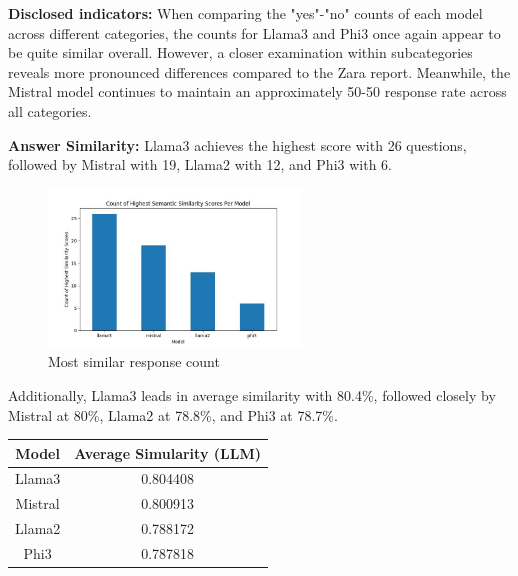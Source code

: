 \documentclass[]{article}
\begin{document}
\textbf{Disclosed indicators:} When comparing the "yes"-"no" counts of each model across different categories, 
the counts for Llama3 and Phi3 once again appear to be quite similar overall. However, 
a closer examination within subcategories reveals more pronounced differences compared to the Zara report. 
Meanwhile, the Mistral model continues to maintain an approximately 50-50 response rate across all categories.
\newline\newline

\textbf{Answer Similarity:} 
Llama3 achieves the highest score with 26 questions, followed by Mistral with 19, Llama2 with 12, and Phi3 with 6.

\begin{figure}[H]
    \centering
    \includegraphics[width=0.6\textwidth]{./images/highest_count_hm.jpg}
    \caption{Most similar response count}
    \label{fig:image_label}
\end{figure}

Additionally, Llama3 leads in average similarity with 80.4\%, followed closely by Mistral at 80\%, Llama2 at 78.8\%, and Phi3 at 78.7\%.

\begin{center}
    \begin{tabular}{||c c||} 
     \hline
     \textbf{Model} & \textbf{Average Simularity (LLM)}  \\ [0.5ex] 
     \hline
     Llama3 &  0.804408\\
     \hline
     Mistral  & 0.800913\\
     \hline
     Llama2 & 0.788172\\
     \hline
     Phi3 &  0.787818 \\
     \hline
    \end{tabular}
\end{center}
\end{document}
